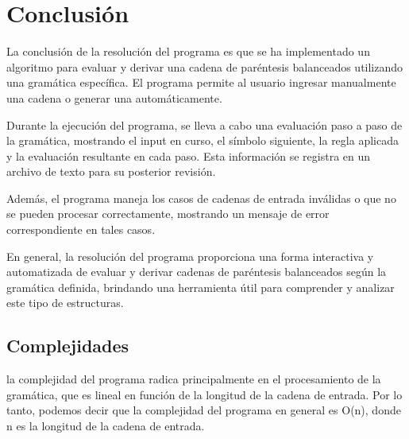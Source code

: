 \chapter{Conclusión}

La conclusión de la resolución del programa es que se ha implementado un algoritmo para evaluar y derivar una cadena de paréntesis balanceados utilizando una gramática específica. El programa permite al usuario ingresar manualmente una cadena o generar una automáticamente.\newline

Durante la ejecución del programa, se lleva a cabo una evaluación paso a paso de la gramática, mostrando el input en curso, el símbolo siguiente, la regla aplicada y la evaluación resultante en cada paso. Esta información se registra en un archivo de texto para su posterior revisión.\newline

Además, el programa maneja los casos de cadenas de entrada inválidas o que no se pueden procesar correctamente, mostrando un mensaje de error correspondiente en tales casos.\newline

En general, la resolución del programa proporciona una forma interactiva y automatizada de evaluar y derivar cadenas de paréntesis balanceados según la gramática definida, brindando una herramienta útil para comprender y analizar este tipo de estructuras.\newline
\\

\section{Complejidades}
la complejidad del programa radica principalmente en el procesamiento de la gramática, que es lineal en función de la longitud de la cadena de entrada. Por lo tanto, podemos decir que la complejidad del programa en general es O(n), donde n es la longitud de la cadena de entrada.